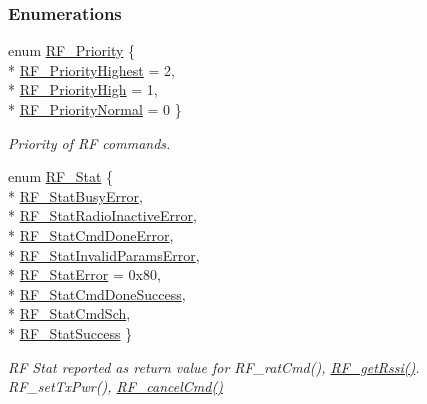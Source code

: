 \subsubsection*{Enumerations}
\begin{DoxyCompactItemize}
\item 
enum \hyperlink{_r_f_8h_ae5f9a893d178e64e6d0a7a783ea06e32}{R\+F\+\_\+\+Priority} \{ \\*
\hyperlink{_r_f_8h_ae5f9a893d178e64e6d0a7a783ea06e32a5d716915abbe5a6fad3469c339f4db15}{R\+F\+\_\+\+Priority\+Highest} = 2, 
\\*
\hyperlink{_r_f_8h_ae5f9a893d178e64e6d0a7a783ea06e32a8d14673dbb643f2e9571fb5e34aad23d}{R\+F\+\_\+\+Priority\+High} = 1, 
\\*
\hyperlink{_r_f_8h_ae5f9a893d178e64e6d0a7a783ea06e32a301d2e5af295d52039b52709952a1c47}{R\+F\+\_\+\+Priority\+Normal} = 0
 \}
\begin{DoxyCompactList}\small\item\em Priority of R\+F commands. \end{DoxyCompactList}\item 
enum \hyperlink{_r_f_8h_afdc219ddabc8427ecd552a6c78d9988f}{R\+F\+\_\+\+Stat} \{ \\*
\hyperlink{_r_f_8h_afdc219ddabc8427ecd552a6c78d9988faa79a13241903199d3bc25c8f06407de9}{R\+F\+\_\+\+Stat\+Busy\+Error}, 
\\*
\hyperlink{_r_f_8h_afdc219ddabc8427ecd552a6c78d9988fa80848b887667038bbfa4a2d14e83b193}{R\+F\+\_\+\+Stat\+Radio\+Inactive\+Error}, 
\\*
\hyperlink{_r_f_8h_afdc219ddabc8427ecd552a6c78d9988fa612e247f325ff085321b8e243f6b1d3d}{R\+F\+\_\+\+Stat\+Cmd\+Done\+Error}, 
\\*
\hyperlink{_r_f_8h_afdc219ddabc8427ecd552a6c78d9988face124dc75bad005452467d6f29351301}{R\+F\+\_\+\+Stat\+Invalid\+Params\+Error}, 
\\*
\hyperlink{_r_f_8h_afdc219ddabc8427ecd552a6c78d9988fac071b8de44aabb8e2354432ce1146b86}{R\+F\+\_\+\+Stat\+Error} = 0x80, 
\\*
\hyperlink{_r_f_8h_afdc219ddabc8427ecd552a6c78d9988faa110d04edae5a85a12906d729f97de87}{R\+F\+\_\+\+Stat\+Cmd\+Done\+Success}, 
\\*
\hyperlink{_r_f_8h_afdc219ddabc8427ecd552a6c78d9988fabf33d4930fd89cd5ca80220da258d31c}{R\+F\+\_\+\+Stat\+Cmd\+Sch}, 
\\*
\hyperlink{_r_f_8h_afdc219ddabc8427ecd552a6c78d9988faa98bd78e437864464cdb2aca1d3e024d}{R\+F\+\_\+\+Stat\+Success}
 \}
\begin{DoxyCompactList}\small\item\em R\+F Stat reported as return value for R\+F\+\_\+rat\+Cmd(), \hyperlink{_r_f_8h_ac3fe0d39243fb6bbefe0216d958a6779}{R\+F\+\_\+get\+Rssi()}. R\+F\+\_\+set\+Tx\+Pwr(), \hyperlink{_r_f_8h_aabe22ceae13a372be4ba135318aa849a}{R\+F\+\_\+cancel\+Cmd()} \end{DoxyCompactList}\item 

\end{DoxyCompactItemize}
